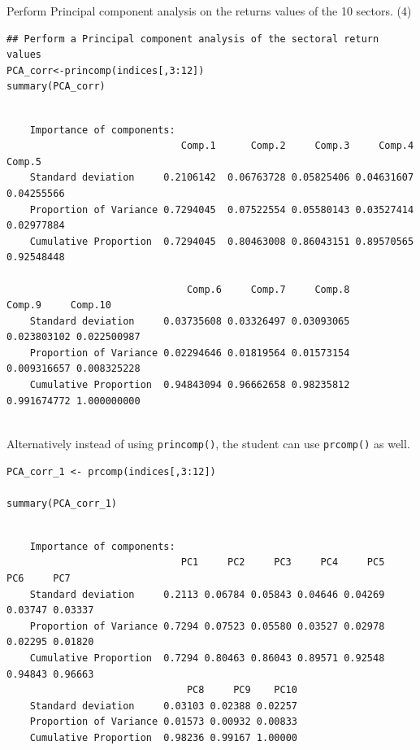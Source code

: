 \documentclass[a4paper,12pt]{article}
\begin{document}
Perform Principal component analysis on the returns values of the 10 sectors. (4)



\begin{framed} \begin{verbatim}
## Perform a Principal component analysis of the sectoral return values
PCA_corr<-princomp(indices[,3:12])
summary(PCA_corr)
\end{verbatim}\end{framed} 

\begin{verbatim}

    Importance of components:
                              Comp.1      Comp.2     Comp.3     Comp.4      Comp.5
    Standard deviation     0.2106142  0.06763728 0.05825406 0.04631607  0.04255566
    Proportion of Variance 0.7294045  0.07522554 0.05580143 0.03527414  0.02977884
    Cumulative Proportion  0.7294045  0.80463008 0.86043151 0.89570565  0.92548448
    
                               Comp.6     Comp.7     Comp.8      Comp.9     Comp.10
    Standard deviation     0.03735608 0.03326497 0.03093065 0.023803102 0.022500987
    Proportion of Variance 0.02294646 0.01819564 0.01573154 0.009316657 0.008325228
    Cumulative Proportion  0.94843094 0.96662658 0.98235812 0.991674772 1.000000000
    
\end{verbatim}
\newpage 

\newpage Alternatively instead of using \texttt{princomp()}, the student can use \texttt{prcomp()} as
well.


\begin{framed} \begin{verbatim}
PCA_corr_1 <- prcomp(indices[,3:12])

summary(PCA_corr_1)
\end{verbatim}\end{framed} 

\begin{verbatim}

    Importance of components:
                              PC1     PC2     PC3     PC4     PC5     PC6     PC7
    Standard deviation     0.2113 0.06784 0.05843 0.04646 0.04269 0.03747 0.03337
    Proportion of Variance 0.7294 0.07523 0.05580 0.03527 0.02978 0.02295 0.01820
    Cumulative Proportion  0.7294 0.80463 0.86043 0.89571 0.92548 0.94843 0.96663
                               PC8     PC9    PC10
    Standard deviation     0.03103 0.02388 0.02257
    Proportion of Variance 0.01573 0.00932 0.00833
    Cumulative Proportion  0.98236 0.99167 1.00000

\end{verbatim}
\newpage 
\end{document}
